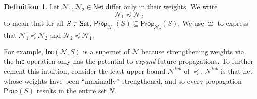 \documentclass[letterpaper]{article}
\theoremstyle{definition}
\newtheorem{definition}{Definition}
\newcommand{\Set}{\mbox{\sf Set}}
\newcommand{\Prop}{\textsf{Prop}}
\newcommand{\Inc}{\textsf{Inc}}
\newcommand{\AllNets}{\mathsf{Net}}
\newcommand{\Net}{\mathcal{N}}
\begin{document}
\begin{definition}
Let $\Net_1, \Net_2 \in \AllNets$ differ only in their weights.  We write
\[
    \Net_1 \preceq \Net_2
\]
to mean that for all $S \in \Set$, $\Prop_{\Net_1}(S) \subseteq \Prop_{\Net_2}(S)$.  We use $\cong$ to express that $\Net_1 \preceq \Net_2$ and $\Net_2 \preceq \Net_1$.
\end{definition}

For example, $\Inc(\Net, S)$ is a supernet of $\Net$ because strengthening weights via the $\Inc$ operation only has the potential to \emph{expand} future propagations.  To further cement this intuition, consider the least upper bound $\mathcal{N}^{lub}$ of $\preceq$.  $\mathcal{N}^{lub}$ is that net whose weights have been ``maximally'' strengthened, and so every propagation $\Prop(S)$ results in the entire set $N$.
\end{document}

